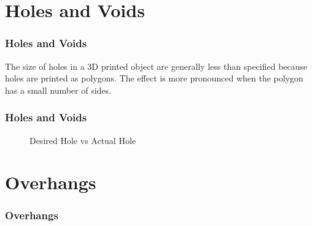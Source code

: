 \documentclass[english,10pt]{beamer}
\begin{document}
\section{Holes and Voids}
\begin{frame}
  \frametitle{Holes and Voids}
  The size of holes in a 3D printed object are generally less than specified because holes are printed as polygons.  The effect is more pronounced when the polygon has a small number of sides.
\end{frame}

\begin{frame}
  \frametitle{Holes and Voids}
  \begin{figure}
    
    \caption{Desired Hole vs Actual Hole}
  \end{figure}
\end{frame}

\section{Overhangs}
\begin{frame}
  \frametitle{Overhangs}
\end{frame}
\end{document}
